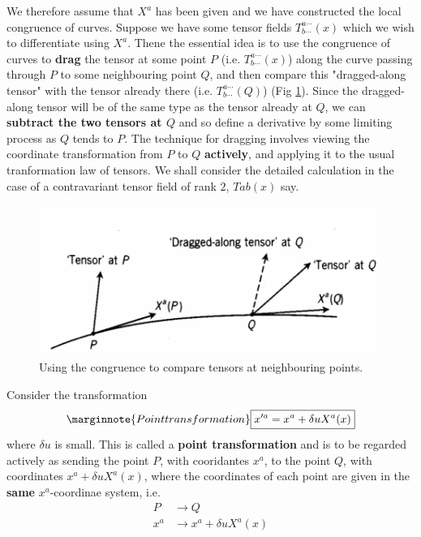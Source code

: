 We therefore assume that $X^{a}$ has been given and we have constructed the local congruence of curves. Suppose we have some tensor fields $T^{a\cdots}_{b\cdots}(x)$ which we wish to differentiate using $X^{a}$. Thene the essential idea is to use the congruence of curves to \textbf{drag} the tensor at some point $P$ (i.e. $T^{a\cdots}_{b\cdots}(x)$) along the curve passing through $P$ to some neighbouring point $Q$, and then compare this "dragged-along tensor" with the tensor already there (i.e. $T^{a\cdots}_{b\cdots}(Q)$) (Fig \ref{fig:6.3}). Since the dragged-along tensor will be of the same type as the tensor already at $Q$, we can \textbf{subtract the two tensors at $Q$} and so define a derivative by some limiting process as $Q$ tends to $P$. The technique for dragging involves viewing the coordinate transformation from $P$ to $Q$ \textbf{actively}, and applying it to the usual tranformation law of tensors. We shall consider the detailed calculation in the case of a contravariant tensor field of rank $2$, $T{ab}(x)$ say.

\begin{figure}[h!]
	\begin{center}
		\includegraphics[scale=0.5]{fig/fig:6-3.png}
		\caption{Using the congruence to compare tensors at neighbouring points.}
		\label{fig:6.3}
	\end{center}	
\end{figure}

Consider the transformation
\begin{equation}\label{6.3}\marginnote{Point transformation}
	\boxed{x'^{a}=x^{a}+\delta u X^{a}(x)}
\end{equation}
where $\delta u$ is small. This is called a \textbf{point transformation} and is to be regarded actively as sending the point $P$, with cooridantes $x^{a}$, to the point $Q$, with coordinates $x^{a}+\delta uX^{a}(x)$, where the coordinates of each point are given in the \textbf{same} $x^{a}$-coordinae system, i.e.
\begin{align*}
	P&\to Q\\
	x^{a}&\to x^{a}+\delta uX^{a}(x)
\end{align*}





